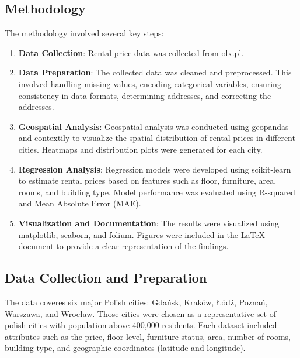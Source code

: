\subsection{Methodology}
The methodology involved several key steps:
\begin{enumerate}
\item \textbf{Data Collection}: Rental price data was collected from olx.pl.
\item \textbf{Data Preparation}: The collected data was cleaned and preprocessed. This involved handling missing values, encoding categorical variables, ensuring consistency in data formats, determining addresses, and correcting the addresses.
\item \textbf{Geospatial Analysis}: Geospatial analysis was conducted using geopandas and contextily to visualize the spatial distribution of rental prices in different cities. Heatmaps and distribution plots were generated for each city.
\item \textbf{Regression Analysis}: Regression models were developed using scikit-learn to estimate rental prices based on features such as floor, furniture, area, rooms, and building type. Model performance was evaluated using R-squared and Mean Absolute Error (MAE).
\item \textbf{Visualization and Documentation}: The results were visualized using matplotlib, seaborn, and folium. Figures were included in the LaTeX document to provide a clear representation of the findings.
\end{enumerate}

\subsection{Data Collection and Preparation}
The data coveres six major Polish cities: Gdańsk, Kraków, Łódź, Poznań, Warszawa, and Wrocław. Those cities were chosen as a representative set of polish cities with population above 400,000 residents. Each dataset included attributes such as the price, floor level, furniture status, area, number of rooms, building type, and geographic coordinates (latitude and longitude).


